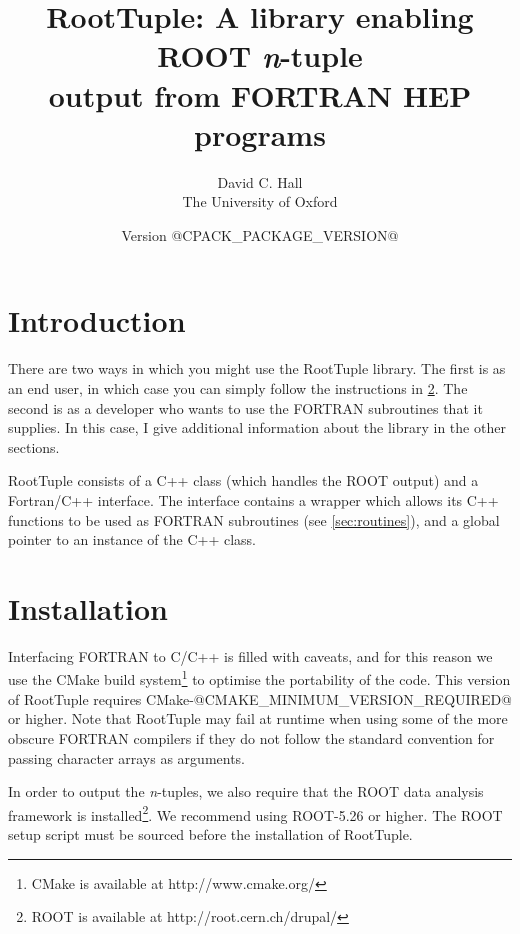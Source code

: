\documentclass[a4paper,12pt]{article}
\begin{document}
\title{RootTuple: A library enabling ROOT \emph{n}-tuple\\ output from FORTRAN HEP programs}
\author{David C. Hall\\ The University of Oxford}
\date{Version @CPACK_PACKAGE_VERSION@}
\maketitle

\tableofcontents
\newpage

\section{Introduction}
\label{sec:intro}
There are two ways in which you might use the RootTuple library. The first is as an end user, in which case you can simply follow the instructions in \textsection\ref{sec:install}. The second is as a developer who wants to use the FORTRAN subroutines that it supplies. In this case, I give additional information about the library in the other sections.

RootTuple consists of a C++ class (which handles the ROOT output) and a Fortran/C++ interface. The interface contains a wrapper which allows its C++ functions to be used as FORTRAN subroutines (see \textsection\ref{sec:routines}), and a global pointer to an instance of the C++ class.

\section{Installation}
\label{sec:install}
Interfacing FORTRAN to C/C++ is filled with caveats, and for this reason we use the CMake build system\footnote{CMake is available at http://www.cmake.org/} to optimise the portability of the code. This version of RootTuple requires CMake-@CMAKE_MINIMUM_VERSION_REQUIRED@ or higher. Note that RootTuple may fail at runtime when using some of the more obscure FORTRAN compilers if they do not follow the standard convention for passing character arrays as arguments.

In order to output the \emph{n}-tuples, we also require that the ROOT data analysis framework is installed\footnote{ROOT is available at http://root.cern.ch/drupal/}. We recommend using ROOT-5.26 or higher. The ROOT setup script must be sourced before the installation of RootTuple.
\end{document}
